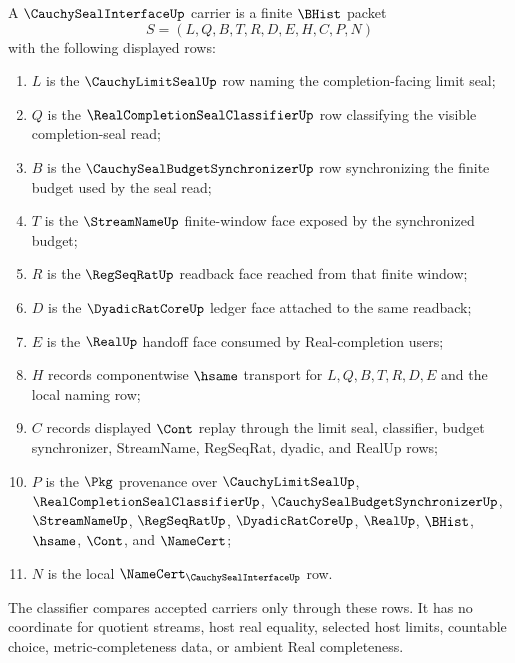 \begin{definition}
\label{def:cauchy-seal-interface-carrier}
A $\CauchySealInterfaceUp$ carrier is a finite $\BHist$ packet
$$
S=(L,Q,B,T,R,D,E,H,C,P,N)
$$
with the following displayed rows:
\begin{enumerate}
\item $L$ is the $\CauchyLimitSealUp$ row naming the completion-facing limit seal;
\item $Q$ is the $\RealCompletionSealClassifierUp$ row classifying the visible completion-seal read;
\item $B$ is the $\CauchySealBudgetSynchronizerUp$ row synchronizing the finite budget used by the seal read;
\item $T$ is the $\StreamNameUp$ finite-window face exposed by the synchronized budget;
\item $R$ is the $\RegSeqRatUp$ readback face reached from that finite window;
\item $D$ is the $\DyadicRatCoreUp$ ledger face attached to the same readback;
\item $E$ is the $\RealUp$ handoff face consumed by Real-completion users;
\item $H$ records componentwise $\hsame$ transport for $L,Q,B,T,R,D,E$ and the local naming row;
\item $C$ records displayed $\Cont$ replay through the limit seal, classifier, budget synchronizer, StreamName, RegSeqRat, dyadic, and RealUp rows;
\item $P$ is the $\Pkg$ provenance over $\CauchyLimitSealUp$, $\RealCompletionSealClassifierUp$, $\CauchySealBudgetSynchronizerUp$, $\StreamNameUp$, $\RegSeqRatUp$, $\DyadicRatCoreUp$, $\RealUp$, $\BHist$, $\hsame$, $\Cont$, and $\NameCert$;
\item $N$ is the local $\NameCert_{\CauchySealInterfaceUp}$ row.
\end{enumerate}
The classifier compares accepted carriers only through these rows. It has no coordinate for quotient streams, host real equality, selected host limits, countable choice, metric-completeness data, or ambient Real completeness.
\end{definition}

